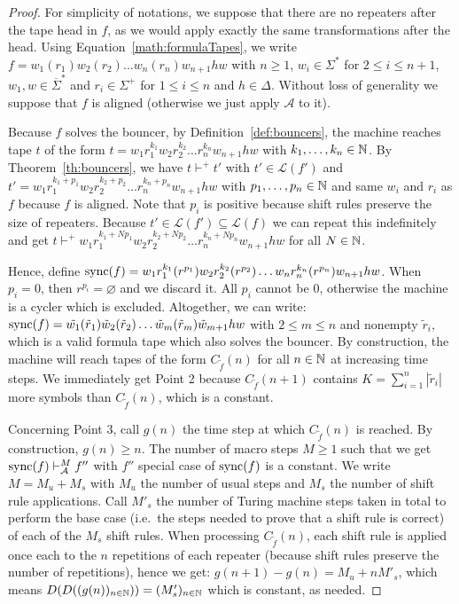 \begin{proof}
    For simplicity of notations, we suppose that there are no repeaters after the tape head in $f$, as we would apply exactly the same transformations after the head. Using Equation~\eqref{math:formulaTapes}, we write $f=w_1(r_1)w_2(r_2)\dots w_n(r_n) w_{n+1} h w$ with $n \geq 1$, $w_i \in \Sigma^*$ for $2 \leq i \leq n+1$, $w_1,w \in \overline{\Sigma}^*$ and $r_i \in \Sigma^+$ for $1 \leq i \leq n$ and $h\in\Delta$. Without loss of generality we suppose that $f$ is aligned (otherwise we just apply $\mathcal{A}$ to it).

    Because $f$ solves the bouncer, by Definition~\ref{def:bouncers}, the machine reaches tape $t$ of the form $t = w_1 r_1^{k_1} w_2 r_2^{k_2} \dots r_n^{k_n} w_{n+1} h w$ with $k_1, \dots, k_n \in \mathbb{N}$. By Theorem~\ref{th:bouncers}, we have $t \vdash^+ t'$ with $t' \in \mathcal{L}(f')$ and $t' = w_1 r_1^{k_1 + p_1} w_2 r_2^{k_2 + p_2} \dots r_n^{k_n + p_n} w_{n+1} h w$ with $p_1, \dots, p_n \in \mathbb{N}$ and same $w_i$ and $r_i$ as $f$ because $f$ is aligned. Note that $p_i$ is positive because shift rules preserve the size of repeaters. Because $t'\in\mathcal{L}(f') \subseteq \mathcal{L}(f)$ we can repeat this indefinitely and get $t \vdash^+ w_1 r_1^{k_1 + Np_1} w_2 r_2^{k_2 + Np_2} \dots r_n^{k_n + Np_n} w_{n+1} h w$ for all $N \in \mathbb{N}$.

    Hence, define $\operatorname{sync}(f) = w_1 r_1^{k_1} (r^{p_1}) w_2 r_2^{k_2} (r^{p_2}) \dots w_n r_n^{k_n} (r^{p_n}) w_{n+1} h w$. When $p_i=0$, then $r^{p_i} = \varnothing$ and we discard it. All $p_i$ cannot be $0$, otherwise the machine is a cycler which is excluded. Altogether, we can write: $\operatorname{sync}(f) = \tilde{w_1} (\tilde{r}_1) \tilde{w}_2 (\tilde{r}_2) \dots \tilde{w}_m (\tilde{r}_m) \tilde{w}_{m+1} h w$ with $2 \leq m \leq n$ and nonempty $\tilde{r}_i$, which is a valid formula tape which also solves the bouncer. By construction, the machine will reach tapes of the form $C_{\tilde{f}}(n)$ for all $n\in\mathbb{N}$ at increasing time steps. We immediately get Point 2 because $C_{\tilde{f}}(n+1)$ contains $K = \sum_{i=1}^n |\tilde{r}_i|$ more symbols than $C_{\tilde{f}}(n)$, which is a constant.

    Concerning Point 3, call $g(n)$ the time step at which $C_{\tilde{f}}(n)$ is reached. By construction, $g(n) \geq n$. The number of macro steps $M \geq 1$ such that we get $\operatorname{sync}(f) \vdash_\mathcal{A}^M f''$ with $f''$ special case of $\operatorname{sync}(f)$ is a constant. We write $M = M_u + M_s$ with $ M_u$ the number of usual steps and $M_s$ the number of shift rule applications. Call $M'_s$ the number of Turing machine steps taken in total to perform the base case (i.e.\ the steps needed to prove that a shift rule is correct) of each of the $M_s$ shift rules. When processing $C_{\tilde{f}}(n)$, each shift rule is applied once each to the $n$ repetitions of each repeater (because shift rules preserve the number of repetitions), hence we get: $g(n+1) - g(n) = M_u + n M'_s$, which means $D(D((g(n))_{n\in\mathbb{N}})) = (M'_s)_{n\in\mathbb{N}}$ which is constant, as needed.

\end{proof}

